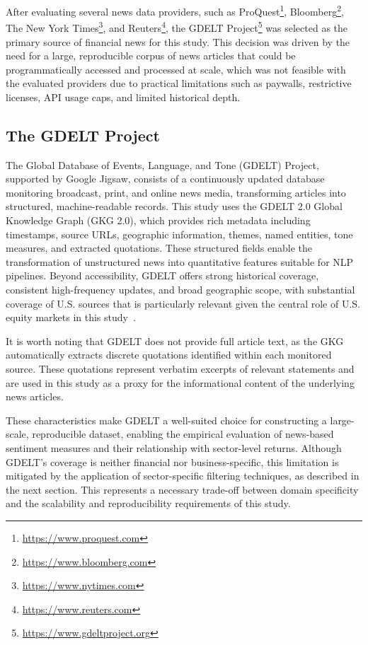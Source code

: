 After evaluating several news data providers, such as ProQuest\footnote{\url{https://www.proquest.com}}, Bloomberg\footnote{\url{https://www.bloomberg.com}}, The New York Times\footnote{\url{https://www.nytimes.com}}, and Reuters\footnote{\url{https://www.reuters.com}}, the GDELT Project\footnote{\url{https://www.gdeltproject.org}} was selected as the primary source of financial news for this study. This decision was driven by the need for a large, reproducible corpus of news articles that could be programmatically accessed and processed at scale, which was not feasible with the evaluated providers due to practical limitations such as paywalls, restrictive licenses, API usage caps, and limited historical depth.

\subsection{The GDELT Project}
\label{subsec:gdelt_why}

The Global Database of Events, Language, and Tone (GDELT) Project, supported by Google Jigsaw, consists of a continuously updated database monitoring broadcast, print, and online news media, transforming articles into structured, machine-readable records. This study uses the GDELT 2.0 Global Knowledge Graph (GKG 2.0), which provides rich metadata including timestamps, source URLs, geographic information, themes, named entities, tone measures, and extracted quotations. These structured fields enable the transformation of unstructured news into quantitative features suitable for NLP pipelines. Beyond accessibility, GDELT offers strong historical coverage, consistent high-frequency updates, and broad geographic scope, with substantial coverage of U.S. sources that is particularly relevant given the central role of U.S. equity markets in this study~\cite{gdelt2015globalworld}.

It is worth noting that GDELT does not provide full article text, as the GKG automatically extracts discrete quotations identified within each monitored source. These quotations represent verbatim excerpts of relevant statements and are used in this study as a proxy for the informational content of the underlying news articles.

These characteristics make GDELT a well-suited choice for constructing a large-scale, reproducible dataset, enabling the empirical evaluation of news-based sentiment measures and their relationship with sector-level returns. Although GDELT's coverage is neither financial nor business-specific, this limitation is mitigated by the application of sector-specific filtering techniques, as described in the next section. This represents a necessary trade-off between domain specificity and the scalability and reproducibility requirements of this study.

